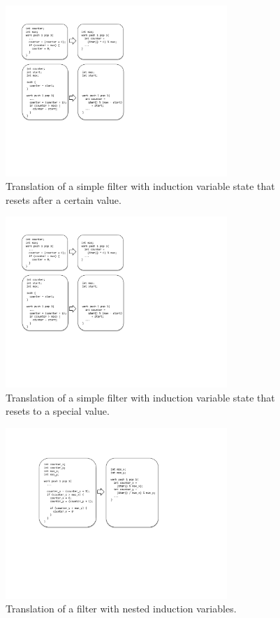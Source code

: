 \begin{figure}[t]
\includegraphics[width=3.3in]{figures/transformation1.pdf}
\caption{Translation of a simple filter with induction variable state that resets after a certain value. \protect\label{fig:transform-after-simple}}
\end{figure}

\begin{figure}[t]
\includegraphics[width=3.3in]{figures/transformation2.pdf}
\caption{Translation of a simple filter with induction variable state that resets to a special value. \protect\label{fig:transform-after-start}}
\end{figure}

\begin{figure}[t]
\includegraphics[width=3.3in]{figures/transformation3.pdf}
\caption{Translation of a filter with nested induction variables. \protect\label{fig:transform-after-twonested}}
\end{figure}


